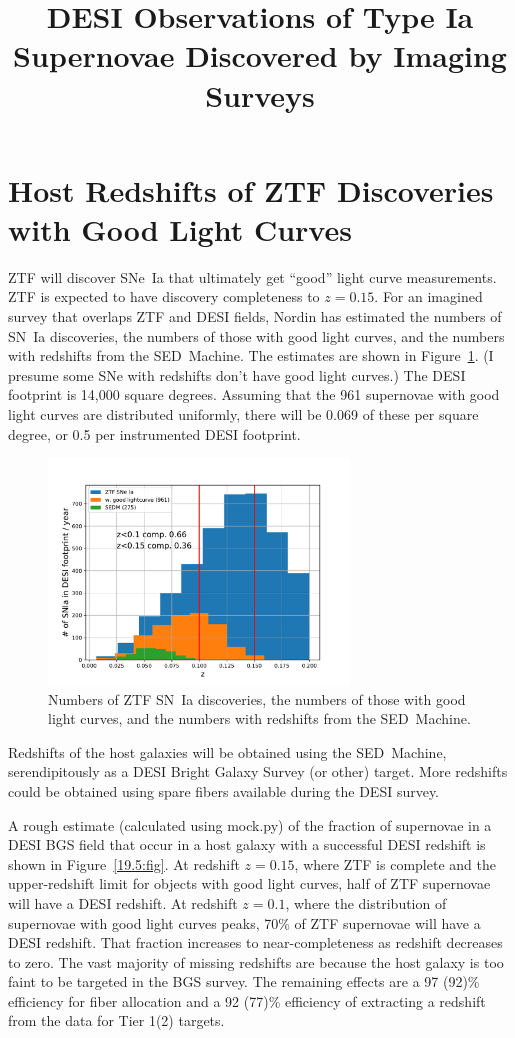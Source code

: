 \documentclass{article}   	%
\title{DESI Observations of Type Ia Supernovae Discovered by Imaging Surveys}
\begin{document}
\maketitle

\section{Host Redshifts of ZTF Discoveries with Good Light Curves}
ZTF will discover SNe~Ia that ultimately get ``good'' light curve measurements.  ZTF is expected to have discovery completeness to $z=0.15$.
For an imagined survey that overlaps ZTF and DESI fields, Nordin has estimated the
numbers of SN~Ia discoveries, the numbers of those with good light curves, and the numbers with redshifts from the SED~Machine.
The estimates are shown in Figure~\ref{ZTFnum:fig}.  (I presume some SNe with redshifts don't have good light curves.) 
The DESI footprint
is 14,000 square degrees.  Assuming that the 961 supernovae with good light curves are distributed uniformly, there will be 0.069
of these per square degree, or 0.5 per instrumented DESI footprint.


\begin{figure}[h]
\includegraphics[width=8cm]{zdist_12m_185_195.pdf}
\centering
\caption{Numbers of ZTF SN~Ia discoveries, the numbers of those with good light curves, and the numbers with redshifts from the SED~Machine.
\label{ZTFnum:fig}}
\end{figure}

Redshifts of the host galaxies will be obtained using the SED~Machine, serendipitously as a DESI Bright Galaxy Survey (or other) target.
More redshifts could be obtained using spare fibers available during the DESI survey.

A rough estimate (calculated
using mock.py)
of the fraction of supernovae in a DESI BGS field 
that occur in a host galaxy with a successful DESI redshift is shown in Figure~\ref{19.5:fig}.
At redshift $z=0.15$, where ZTF is complete and the upper-redshift limit for objects with good light curves, half of ZTF supernovae will have a DESI redshift.
At redshift $z=0.1$, where the distribution of supernovae with good light curves peaks, 70\% of ZTF supernovae will have a DESI redshift.
That fraction increases to near-completeness as redshift decreases to zero.
The vast majority of missing redshifts are
because the host galaxy is too faint to be targeted in the BGS survey.
The remaining effects are
a 97 (92)\% efficiency for fiber allocation and a 92 (77)\% efficiency of extracting a redshift from the data for Tier 1(2) targets. 
\end{document}
